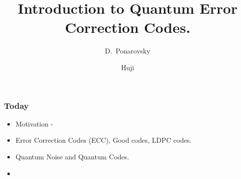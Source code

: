 \documentclass[usenames, aspectratio=169]{beamer}
\begin{document}
\title[ Introduction to Quantum Error Correction Codes. ] %
{Introduction to Quantum Error Correction Codes.}

\subtitle{  }
\author[D.~Ponarovsky] %
	{D.~Ponarovsky}

\date[2022-23] %
{Huji}
\subject{QECC}
\begin{frame}
  \maketitle
\end{frame}

\begin{frame}
  \frametitle{ Today }
  
  \begin{itemize}[<+->]
    \item Motivation - 
    \item Error Correction Codes (ECC), Good codes, LDPC codes.
    \item Quantum Noise and Quantum Codes.  
    \item 
  \end{itemize}
\end{frame}

\begin{frame}
\end{frame}

\printbibliography
\end{document}
